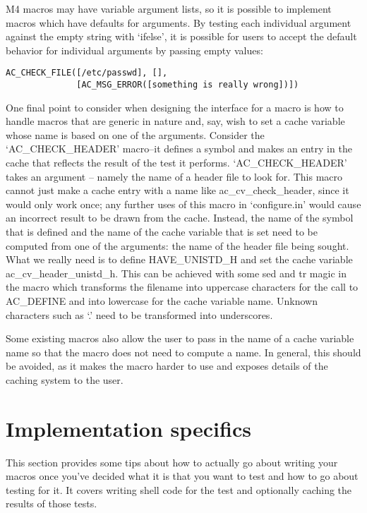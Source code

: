 M4 macros may have variable argument lists, so it is possible to implement macros which have defaults for arguments. By testing each individual argument against the empty string with `ifelse', it is possible for users to accept the default behavior for individual arguments by passing empty values: 

\begin{Verbatim}[frame=single]
AC_CHECK_FILE([/etc/passwd], [],
              [AC_MSG_ERROR([something is really wrong])])
\end{Verbatim}

One final point to consider when designing the interface for a macro is how to handle macros that are generic in nature and, say, wish to set a cache variable whose name is based on one of the arguments. Consider the `AC\_{}CHECK\_{}HEADER' macro--it defines a symbol and makes an entry in the cache that reflects the result of the test it performs. `AC\_{}CHECK\_{}HEADER' takes an argument -- namely the name of a header file to look for. This macro cannot just make a cache entry with a name like ac\_{}cv\_{}check\_{}header, since it would only work once; any further uses of this macro in `configure.in' would cause an incorrect result to be drawn from the cache. Instead, the name of the symbol that is defined and the name of the cache variable that is set need to be computed from one of the arguments: the name of the header file being sought. What we really need is to define HAVE\_{}UNISTD\_{}H and set the cache variable ac\_{}cv\_{}header\_{}unistd\_{}h. This can be achieved with some sed and tr magic in the macro which transforms the filename into uppercase characters for the call to AC\_{}DEFINE and into lowercase for the cache variable name. Unknown characters such as `.' need to be transformed into underscores.

Some existing macros also allow the user to pass in the name of a cache variable name so that the macro does not need to compute a name. In general, this should be avoided, as it makes the macro harder to use and exposes details of the caching system to the user. 

\section{Implementation specifics}

This section provides some tips about how to actually go about writing your macros once you've decided what it is that you want to test and how to go about testing for it. It covers writing shell code for the test and optionally caching the results of those tests. 

